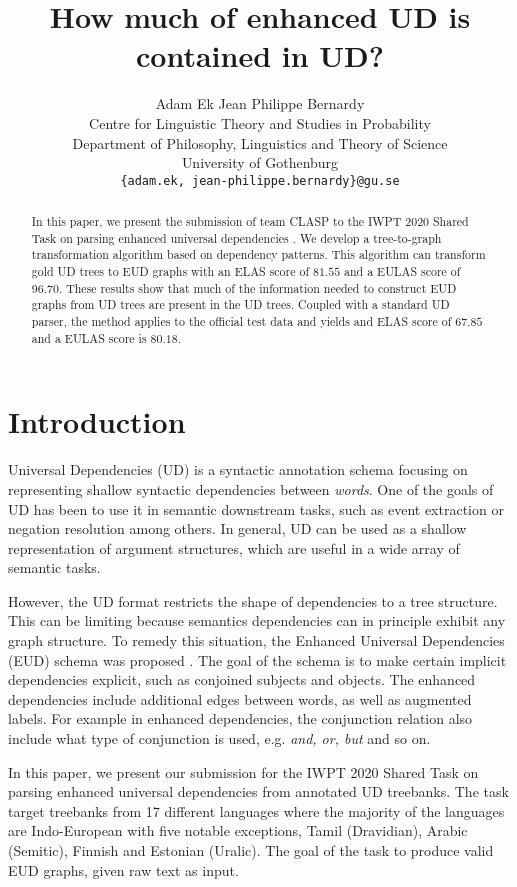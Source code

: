 \documentclass[11pt,a4paper]{article}
\title{How much of enhanced UD is contained in UD?}
\author{Adam Ek \qquad Jean Philippe Bernardy\\
    Centre for Linguistic Theory and Studies in Probability \\
    Department of Philosophy, Linguistics and Theory of Science \\
    University of Gothenburg \\
    \texttt{\{adam.ek, jean-philippe.bernardy\}@gu.se} \\}
\date{}
\begin{document}
\maketitle
    
\begin{abstract}
In this paper, we present the submission of team CLASP to the IWPT
2020 Shared Task on parsing enhanced universal dependencies
\citep{EUDparsingST:2020}. We develop a tree-to-graph
transformation algorithm based on dependency patterns. This
algorithm can transform gold UD trees to EUD graphs with an ELAS
score of $81.55$ and a EULAS score of $96.70$.  These results show
that much of the information needed to construct EUD graphs from
UD trees are present in the UD trees.
%
Coupled with a standard UD parser, the method applies to the
official test data and yields and ELAS score of $67.85$ and a EULAS
score is $80.18$.
\end{abstract}

\section{Introduction}
Universal Dependencies (UD) is a syntactic annotation schema
focusing on representing shallow syntactic dependencies between
\emph{words}. One of the goals of UD has been to use it in
semantic downstream tasks, such as event extraction
\citep{fares20182018, mcclosky2011event} or negation resolution
\citep{fares20182018} among others. In general, UD can be used as
a shallow representation of argument structures, which are useful
in a wide array of semantic tasks.

However, the UD format restricts the shape of dependencies to a tree
structure.  This can be limiting because semantics dependencies can
in principle exhibit any graph structure.
To remedy this situation, the Enhanced Universal Dependencies
(EUD) schema was proposed \citep{schuster2016enhanced}. The goal
of the schema is to make certain implicit dependencies explicit,
such as conjoined subjects and objects. The enhanced dependencies
include additional edges between words, as well as augmented
labels. For example in enhanced dependencies, the conjunction
relation also include what type of conjunction is used, e.g.
\textit{and, or, but} and so on.

In this paper, we present our submission for the IWPT 2020 Shared
Task on parsing enhanced universal dependencies from annotated UD
treebanks. The task target treebanks from 17 different languages
where the majority of the languages are Indo-European with five
notable exceptions, Tamil (Dravidian), Arabic (Semitic), Finnish
and Estonian (Uralic).  The goal of the task to produce valid EUD
graphs, given raw text as input.
\end{document}
